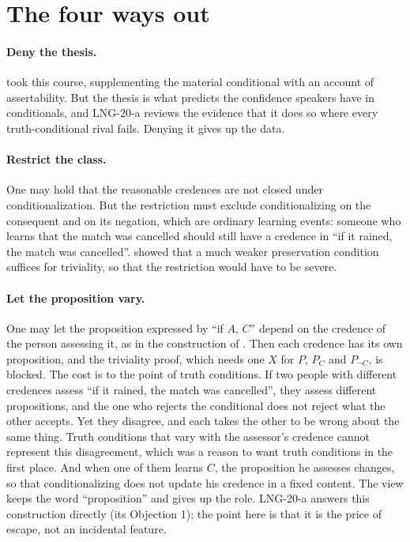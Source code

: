 \documentclass{situationist-preprint}
\begin{document}
\section{The four ways out}

\paragraph{Deny the thesis.} \citet{Lewis1976} took this course, supplementing the material conditional with an account of assertability. But the thesis is what predicts the confidence speakers have in conditionals, and LNG-20-a reviews the evidence that it does so where every truth-conditional rival fails. Denying it gives up the data.

\paragraph{Restrict the class.} One may hold that the reasonable credences are not closed under conditionalization. But the restriction must exclude conditionalizing on the consequent and on its negation, which are ordinary learning events: someone who learns that the match was cancelled should still have a credence in \enquote{if it rained, the match was cancelled}. \citet{Bradley2000} showed that a much weaker preservation condition suffices for triviality, so that the restriction would have to be severe.

\paragraph{Let the proposition vary.} One may let the proposition expressed by \enquote{if $A$, $C$} depend on the credence of the person assessing it, as in the construction of \citet{vanFraassen1976}. Then each credence has its own proposition, and the triviality proof, which needs one $X$ for $P$, $P_C$ and $P_{\neg C}$, is blocked. The cost is to the point of truth conditions. If two people with different credences assess \enquote{if it rained, the match was cancelled}, they assess different propositions, and the one who rejects the conditional does not reject what the other accepts. Yet they disagree, and each takes the other to be wrong about the same thing. Truth conditions that vary with the assessor's credence cannot represent this disagreement, which was a reason to want truth conditions in the first place. And when one of them learns $C$, the proposition he assesses changes, so that conditionalizing does not update his credence in a fixed content. The view keeps the word \enquote{proposition} and gives up the role. LNG-20-a answers this construction directly (its Objection 1); the point here is that it is the price of escape, not an incidental feature.
\end{document}
